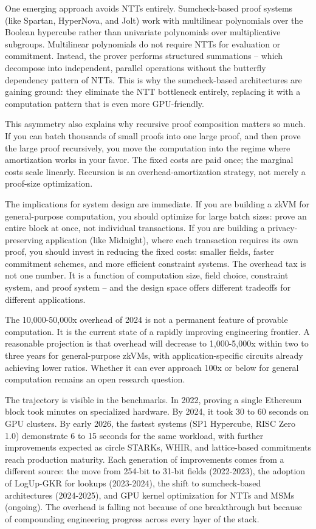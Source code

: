 \documentclass[
  11pt,
  openany]{report}
\begin{document}
One emerging approach avoids NTTs entirely. Sumcheck-based proof systems (like
Spartan, HyperNova, and Jolt) work with multilinear polynomials over the Boolean
hypercube rather than univariate polynomials over multiplicative subgroups.
Multilinear polynomials do not require NTTs for evaluation or commitment.
Instead, the prover performs structured summations -- which decompose into
independent, parallel operations without the butterfly dependency pattern of
NTTs. This is why the sumcheck-based architectures are gaining ground: they
eliminate the NTT bottleneck entirely, replacing it with a computation pattern
that is even more GPU-friendly.

This asymmetry also explains why recursive proof composition matters so much. If
you can batch thousands of small proofs into one large proof, and then prove the
large proof recursively, you move the computation into the regime where
amortization works in your favor. The fixed costs are paid once; the marginal
costs scale linearly. Recursion is an overhead-amortization strategy, not merely
a proof-size optimization.

The implications for system design are immediate. If you are building a zkVM for
general-purpose computation, you should optimize for large batch sizes: prove an
entire block at once, not individual transactions. If you are building a
privacy-preserving application (like Midnight), where each transaction requires
its own proof, you should invest in reducing the fixed costs: smaller fields,
faster commitment schemes, and more efficient constraint systems. The overhead
tax is not one number. It is a function of computation size, field choice,
constraint system, and proof system -- and the design space offers different
tradeoffs for different applications.

The 10,000-50,000x overhead of 2024 is not a permanent feature of provable
computation. It is the current state of a rapidly improving engineering
frontier. A reasonable projection is that overhead will decrease to 1,000-5,000x
within two to three years for general-purpose zkVMs, with application-specific
circuits already achieving lower ratios. Whether it can ever approach 100x or
below for general computation remains an open research question.

The trajectory is visible in the benchmarks. In 2022, proving a single Ethereum
block took minutes on specialized hardware. By 2024, it took 30 to 60 seconds on
GPU clusters. By early 2026, the fastest systems (SP1 Hypercube, RISC Zero 1.0)
demonstrate 6 to 15 seconds for the same workload, with further improvements
expected as circle STARKs, WHIR, and lattice-based commitments reach production
maturity. Each generation of improvements comes from a different source: the
move from 254-bit to 31-bit fields (2022-2023), the adoption of LogUp-GKR for
lookups (2023-2024), the shift to sumcheck-based architectures (2024-2025), and
GPU kernel optimization for NTTs and MSMs (ongoing). The overhead is falling not
because of one breakthrough but because of compounding engineering progress
across every layer of the stack.
\end{document}
